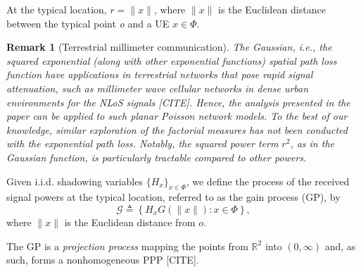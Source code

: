 \documentclass[lettersize,journal]{IEEEtran}
\newtheorem*{remark}{Remark}
\begin{document}
  At the typical location, $r=\|x\|$, where $\| x\|$ is the Euclidean distance between the typical point \textit{o} and a UE $x\in \Phi$.


  \begin{remark}[Terrestrial millimeter communication]
    The Gaussian, \textit{i.e.}, the squared exponential (along with other exponential functions) spatial path loss function have applications in terrestrial networks that pose rapid signal attenuation, such as millimeter wave cellular networks in dense urban environments for the NLoS signals [CITE]. Hence, the analysis presented in the paper can be applied to such planar Poisson network models. To the best of our knowledge, similar exploration of the factorial measures has not been conducted with the exponential path loss.  Notably, the squared power term $r^2$, as in the Gaussian function, is particularly tractable compared to other powers. 
  \end{remark}

Given i.i.d. shadowing variables $\{H_x\}_{x \in \Phi}$, we define the process of the received signal powers at the typical location, referred to as the gain process (GP), by
\begin{equation}
  \label{eq:gainprocess}
  \mathcal{G} \triangleq \left\{ H_x G(\|x\|) : x \in \Phi \right\},
\end{equation}
where $\|x\|$ is the Euclidean distance from $\textit{o}$. 

The GP is a \textit{projection process} mapping the points from $\mathbb{R}^2$ into $(0,\infty)$ and, as such, forms a nonhomogeneous PPP [CITE].
\end{document}
